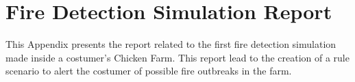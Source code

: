\chapter{Fire Detection Simulation Report}
\label{AppendixH}

This Appendix presents the report related to the first fire detection simulation made inside a costumer's Chicken Farm. This report lead to the creation of a rule scenario to alert the costumer of possible fire outbreaks in the farm.


